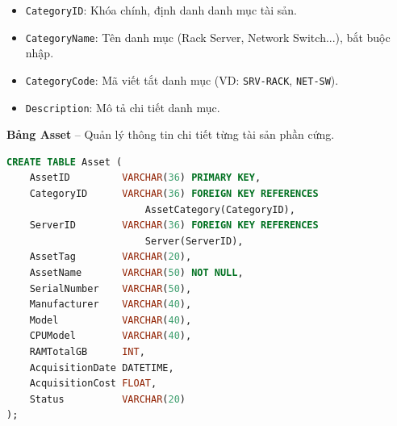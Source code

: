\begin{itemize}[leftmargin=2em]
    \item \texttt{CategoryID}: Khóa chính, định danh danh mục tài sản.
    \item \texttt{CategoryName}: Tên danh mục (Rack Server, Network Switch...), bắt buộc nhập.
    \item \texttt{CategoryCode}: Mã viết tắt danh mục (VD: \texttt{SRV-RACK}, \texttt{NET-SW}).
    \item \texttt{Description}: Mô tả chi tiết danh mục.
\end{itemize}

\vspace{0.5em}
\noindent\textbf{Bảng Asset} -- Quản lý thông tin chi tiết từng tài sản phần cứng.

\begin{tcolorbox}[colback=gray!5, colframe=gray!60, title={\textbf{CREATE TABLE Asset}}, fonttitle=\bfseries\small, boxrule=0.5pt, arc=2pt]
\begin{lstlisting}[language=SQL, basicstyle=\ttfamily\small, breaklines=true, showstringspaces=false, keywordstyle=\bfseries\color{blue!70!black}, stringstyle=\color{red!70!black}, commentstyle=\itshape\color{green!50!black}]
CREATE TABLE Asset (
    AssetID         VARCHAR(36) PRIMARY KEY,
    CategoryID      VARCHAR(36) FOREIGN KEY REFERENCES
                        AssetCategory(CategoryID),
    ServerID        VARCHAR(36) FOREIGN KEY REFERENCES
                        Server(ServerID),
    AssetTag        VARCHAR(20),
    AssetName       VARCHAR(50) NOT NULL,
    SerialNumber    VARCHAR(50),
    Manufacturer    VARCHAR(40),
    Model           VARCHAR(40),
    CPUModel        VARCHAR(40),
    RAMTotalGB      INT,
    AcquisitionDate DATETIME,
    AcquisitionCost FLOAT,
    Status          VARCHAR(20)
);
\end{lstlisting}
\end{tcolorbox}

